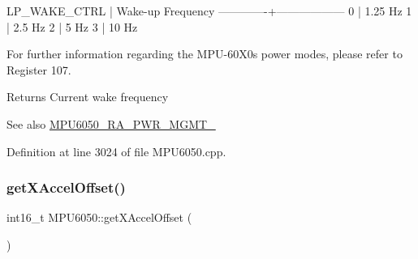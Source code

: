 \begin{DoxyPre}
LP\_WAKE\_CTRL | Wake-up Frequency
-------------+------------------
0            | 1.25 Hz
1            | 2.5 Hz
2            | 5 Hz
3            | 10 Hz
\end{DoxyPre}


For further information regarding the M\+P\+U-\/60\+X0\textquotesingle{}s power modes, please refer to Register 107.

\begin{DoxyReturn}{Returns}
Current wake frequency 
\end{DoxyReturn}
\begin{DoxySeeAlso}{See also}
\mbox{\hyperlink{MPU6050_8h_aace6ce286da4d5f8c8f5ba6f80688e13}{M\+P\+U6050\+\_\+\+R\+A\+\_\+\+P\+W\+R\+\_\+\+M\+G\+M\+T\+\_}} 
\end{DoxySeeAlso}


Definition at line 3024 of file M\+P\+U6050.\+cpp.


\begin{DoxyCode}{0}

\end{DoxyCode}
\mbox{\label{classMPU6050_afdfe715ced419d117c2c47007d631f9e}} 
\subsubsection{\texorpdfstring{getXAccelOffset()}{getXAccelOffset()}}
{\footnotesize\ttfamily int16\+\_\+t M\+P\+U6050\+::get\+X\+Accel\+Offset (\begin{DoxyParamCaption}{ }\end{DoxyParamCaption})}



